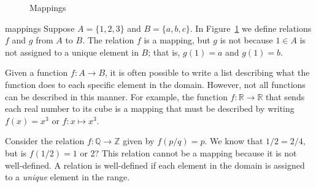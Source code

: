 \begin{figure}[htb]\label{sets_figure_mappings} %
\caption{Mappings}
\bigskip
\begin{center}
\end{center}
\end{figure}

\begin{example}{mappings}
Suppose $A = \{1, 2, 3 \}$ and $B = \{a, b, c \}$.  In Figure~\ref{sets_figure_mappings} we define relations $f$ and  $g$ from $A$ to $B$.  The relation $f$ is a mapping, but $g$ is not because $1 \in A$ is not assigned to a unique element in $B$; that is, $g(1) = a$ and $g(1) = b$.  
\end{example}

Given a function $f : A \rightarrow B$, it is often possible to write a list describing what the function does to each specific element in the domain.  However, not all functions can be described in this manner.  For example, the function $f: {\mathbb R} \rightarrow {\mathbb R}$ that sends each real number to its cube is a mapping that must be described by writing $f(x) = x^3$ or $f:x \mapsto x^3$. 
 
Consider the relation $f : {\mathbb Q} \rightarrow {\mathbb Z}$ given by $f(p/q) = p$.  We know that $1/2 = 2/4$, but is $f(1/2) = 1$ or 2?  This relation cannot be a mapping because it is not well-defined.  A relation is {\bfi well-defined\/} if each element in the domain is assigned to a {\em unique\/} element in the range. 

